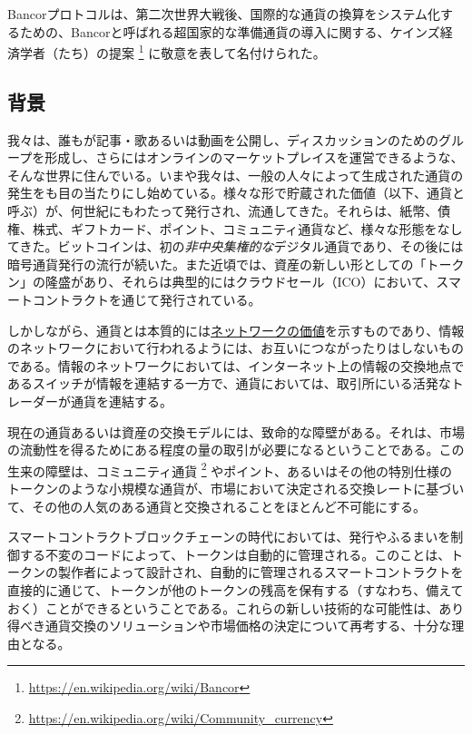 \documentclass{jsarticle}
\begin{document}
Bancorプロトコルは、第二次世界大戦後、国際的な通貨の換算をシステム化するための、Bancorと呼ばれる超国家的な準備通貨の導入に関する、ケインズ経済学者（たち）の提案
\footnote{\url{https://en.wikipedia.org/wiki/Bancor}}
に敬意を表して名付けられた。

  \subsection{背景}

  我々は、誰もが記事・歌あるいは動画を公開し、ディスカッションのためのグループを形成し、さらにはオンラインのマーケットプレイスを運営できるような、そんな世界に住んでいる。いまや我々は、一般の人々によって生成された通貨の発生をも目の当たりにし始めている。様々な形で貯蔵された価値（以下、通貨と呼ぶ）が、何世紀にもわたって発行され、流通してきた。それらは、紙幣、債権、株式、ギフトカード、ポイント、コミュニティ通貨など、様々な形態をなしてきた。ビットコインは、初の\emph{非中央集権的な}デジタル通貨であり、その後には暗号通貨発行の流行が続いた。また近頃では、資産の新しい形としての「トークン」の隆盛があり、それらは典型的にはクラウドセール（ICO）において、スマートコントラクトを通じて発行されている。

  しかしながら、通貨とは本質的には\href{https://blog.bancor.network/coins-are-networks-and-crowdsales-are-their-killer-app-a6ebc16bef31}{ネットワークの価値}を示すものであり、情報のネットワークにおいて行われるようには、お互いにつながったりはしないものである。情報のネットワークにおいては、インターネット上の情報の交換地点であるスイッチが情報を連結する一方で、通貨においては、取引所にいる活発なトレーダーが通貨を連結する。
  
  現在の通貨あるいは資産の交換モデルには、致命的な障壁がある。それは、市場の流動性を得るためにある程度の量の取引が必要になるということである。この生来の障壁は、コミュニティ通貨
  \footnote{\url{https://en.wikipedia.org/wiki/Community_currency}}
  やポイント、あるいはその他の特別仕様のトークンのような小規模な通貨が、市場において決定される交換レートに基づいて、その他の人気のある通貨と交換されることをほとんど不可能にする。

  スマートコントラクトブロックチェーンの時代においては、発行やふるまいを制御する不変のコードによって、トークンは自動的に管理される。このことは、トークンの製作者によって設計され、自動的に管理されるスマートコントラクトを直接的に通じて、トークンが他のトークンの残高を保有する（すなわち、備えておく）ことができるということである。これらの新しい技術的な可能性は、あり得べき通貨交換のソリューションや市場価格の決定について再考する、十分な理由となる。
\end{document}
